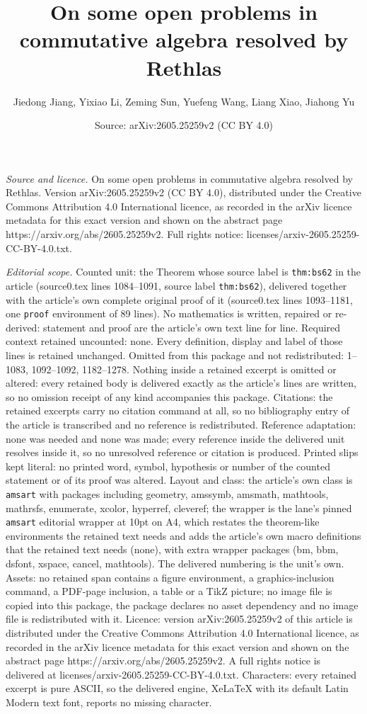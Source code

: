 \documentclass[10pt,a4paper]{amsart}
\title[On some open problems in commutative algebra resolved by Ret]{On some open problems in commutative algebra resolved by Rethlas}
\author{Jiedong Jiang, Yixiao Li, Zeming Sun, Yuefeng Wang, Liang Xiao, Jiahong Yu}
\date{Source: arXiv:2605.25259v2 (CC BY 4.0)}
\begin{document}
\maketitle

\noindent\emph{Source and licence.} On some open problems in commutative algebra resolved by Rethlas. Version arXiv:2605.25259v2 (CC BY 4.0), distributed under the Creative Commons Attribution 4.0 International licence, as recorded in the arXiv licence metadata for this exact version and shown on the abstract page https://arxiv.org/abs/2605.25259v2. Full rights notice: licenses/arxiv-2605.25259-CC-BY-4.0.txt.\par\smallskip

\noindent\textit{Editorial scope.} Counted unit: the Theorem whose source label is \texttt{thm:bs62} in the article (source0.tex lines 1084--1091, source label \texttt{thm:bs62}), delivered together with the article's own complete original proof of it (source0.tex lines 1093--1181, one \texttt{proof} environment of 89 lines). No mathematics is written, repaired or re-derived: statement and proof are the article's own text line for line. Required context retained uncounted: none. Every definition, display and label of those lines is retained unchanged. Omitted from this package and not redistributed: 1--1083, 1092--1092, 1182--1278. Nothing inside a retained excerpt is omitted or altered: every retained body is delivered exactly as the article's lines are written, so no omission receipt of any kind accompanies this package. Citations: the retained excerpts carry no citation command at all, so no bibliography entry of the article is transcribed and no reference is redistributed. Reference adaptation: none was needed and none was made; every reference inside the delivered unit resolves inside it, so no unresolved reference or citation is produced. Printed slips kept literal: no printed word, symbol, hypothesis or number of the counted statement or of its proof was altered. Layout and class: the article's own class is \texttt{amsart} with packages including geometry, amssymb, amsmath, mathtools, mathrsfs, enumerate, xcolor, hyperref, cleveref; the wrapper is the lane's pinned \texttt{amsart} editorial wrapper at 10pt on A4, which restates the theorem-like environments the retained text needs and adds the article's own macro definitions that the retained text needs (none), with extra wrapper packages (bm, bbm, dsfont, xspace, cancel, mathtools). The delivered numbering is the unit's own. Assets: no retained span contains a figure environment, a graphics-inclusion command, a PDF-page inclusion, a table or a TikZ picture; no image file is copied into this package, the package declares no asset dependency and no image file is redistributed with it. Licence: version arXiv:2605.25259v2 of this article is distributed under the Creative Commons Attribution 4.0 International licence, as recorded in the arXiv licence metadata for this exact version and shown on the abstract page https://arxiv.org/abs/2605.25259v2. A full rights notice is delivered at licenses/arxiv-2605.25259-CC-BY-4.0.txt. Characters: every retained excerpt is pure ASCII, so the delivered engine, XeLaTeX with its default Latin Modern text font, reports no missing character.
\end{document}
